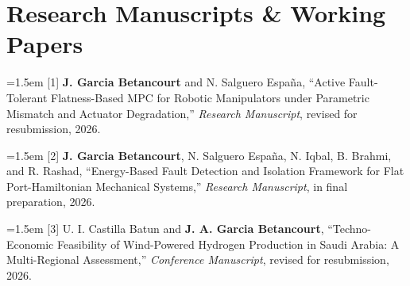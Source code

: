 \documentclass[10pt,a4paper]{article}
\begin{document}
\section*{Research Manuscripts \& Working Papers}

\hangindent=1.5em 
[1] \textbf{J. Garcia Betancourt} and N. Salguero España, ``Active Fault-Tolerant Flatness-Based MPC for Robotic Manipulators under Parametric Mismatch and Actuator Degradation,'' \textit{Research Manuscript}, revised for resubmission, 2026.

\vspace{2pt}
\hangindent=1.5em 
[2] \textbf{J. Garcia Betancourt}, N. Salguero España, N. Iqbal, B. Brahmi, and R. Rashad, ``Energy-Based Fault Detection and Isolation Framework for Flat Port-Hamiltonian Mechanical Systems,'' \textit{Research Manuscript}, in final preparation, 2026.

\vspace{2pt}
\hangindent=1.5em 
[3] U. I. Castilla Batun and \textbf{J. A. Garcia Betancourt}, ``Techno-Economic Feasibility of Wind-Powered Hydrogen Production in Saudi Arabia: A Multi-Regional Assessment,'' \textit{Conference Manuscript}, revised for resubmission, 2026.

\vspace{6pt}
\end{document}
